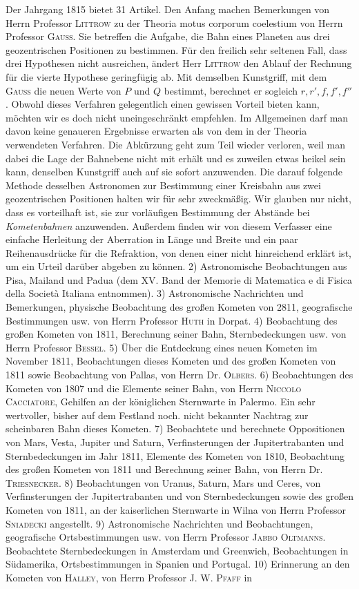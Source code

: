 Der Jahrgang 1815 bietet 31 Artikel. Den Anfang machen Bemerkungen von Herrn Professor \textsc{Littrow} zu der Theoria motus corporum coelestium von Herrn Professor \textsc{Gauss}. Sie betreffen die Aufgabe, die Bahn eines Planeten aus drei geozentrischen Positionen zu bestimmen. Für den freilich sehr seltenen Fall, dass drei Hypothesen nicht ausreichen, ändert Herr \textsc{Littrow} den Ablauf der Rechnung für die vierte Hypothese geringfügig ab. Mit demselben Kunstgriff, mit dem \textsc{Gauss} die neuen Werte von $P$ und $Q$ bestimmt, berechnet er sogleich $r, r', f, f', f''$. Obwohl dieses Verfahren gelegentlich einen gewissen Vorteil bieten kann, möchten wir es doch nicht uneingeschränkt empfehlen. Im Allgemeinen darf man davon keine genaueren Ergebnisse erwarten als von dem in der Theoria verwendeten Verfahren. Die Abkürzung geht zum Teil wieder verloren, weil man dabei die Lage der Bahnebene nicht mit erhält und es zuweilen etwas heikel sein kann, denselben Kunstgriff auch auf sie sofort anzuwenden. Die darauf folgende Methode desselben Astronomen zur Bestimmung einer Kreisbahn aus zwei geozentrischen Positionen halten wir für sehr zweckmäßig. Wir glauben nur nicht, dass es vorteilhaft ist, sie zur vorläufigen Bestimmung der Abstände bei \emph{Kometenbahnen} anzuwenden. Außerdem finden wir von diesem Verfasser eine einfache Herleitung der Aberration in Länge und Breite und ein paar Reihenausdrücke für die Refraktion, von denen einer nicht hinreichend erklärt ist, um ein Urteil darüber abgeben zu können. 2) Astronomische Beobachtungen aus Pisa, Mailand und Padua (dem XV. Band der Memorie di Matematica e di Fisica della Società Italiana entnommen). 3) Astronomische Nachrichten und Bemerkungen, physische Beobachtung des großen Kometen von 2811, geografische Bestimmungen usw. von Herrn Professor \textsc{Huth} in Dorpat. 4) Beobachtung des großen Kometen von 1811, Berechnung seiner Bahn, Sternbedeckungen usw. von Herrn Professor \textsc{Bessel}. 5) Über die Entdeckung eines neuen Kometen im November 1811, Beobachtungen dieses Kometen und des großen Kometen von 1811 sowie Beobachtung von Pallas, von Herrn Dr. \textsc{Olbers}. 6) Beobachtungen des Kometen von 1807 und die Elemente seiner Bahn, von Herrn \textsc{Niccolo Cacciatore}, Gehilfen an der königlichen Sternwarte in Palermo. Ein sehr wertvoller, bisher auf dem Festland noch. nicht bekannter Nachtrag zur scheinbaren Bahn dieses Kometen. 7) Beobachtete und berechnete Oppositionen von Mars, Vesta, Jupiter und Saturn, Verfinsterungen der Jupitertrabanten und Sternbedeckungen im Jahr 1811, Elemente des Kometen von 1810, Beobachtung des großen Kometen von 1811 und Berechnung seiner Bahn, von Herrn Dr. \textsc{Triesnecker}. 8) Beobachtungen von Uranus, Saturn, Mars und Ceres, von Verfinsterungen der Jupitertrabanten und von Sternbedeckungen sowie des großen Kometen von 1811, an der kaiserlichen Sternwarte in Wilna von Herrn Professor \textsc{Sniadecki} angestellt. 9) Astronomische Nachrichten und Beobachtungen, geografische Ortsbestimmungen usw. von Herrn Professor \textsc{Jabbo Oltmanns}. Beobachtete Sternbedeckungen in Amsterdam und Greenwich, Beobachtungen in Südamerika, Ortsbestimmungen in Spanien und Portugal. 10) Erinnerung an den Kometen von \textsc{Halley}, von Herrn Professor J. W. \textsc{Pfaff} in 